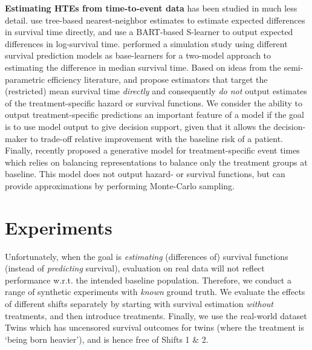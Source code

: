 \documentclass{article}
\begin{document}
\textbf{Estimating HTEs from time-to-event data} has been studied in much less detail. \cite{ tabib2020non, zhang2017mining} use tree-based nearest-neighbor estimates to estimate expected differences in survival time directly, and \cite{henderson2020individualized} use a BART-based S-learner to output expected differences in log-survival time. \cite{hu2020estimating} performed a simulation study using different survival prediction models as base-learners for a two-model approach to estimating the difference in median survival time. Based on ideas from the semi-parametric efficiency literature, \cite{cui2020estimating}
and \cite{diaz2018targeted} propose estimators that target the (restricted) mean survival time \textit{directly} and consequently \textit{do not} output estimates of the treatment-specific hazard or survival functions. We consider the ability to output treatment-specific predictions an important feature of a model if the goal is to use model output to give decision support, given that it allows the decision-maker to trade-off relative improvement with the baseline risk of a patient. Finally, \cite{chapfuwa2021enabling} recently proposed a generative model for treatment-specific event times which relies on balancing representations to balance only the treatment groups at baseline. This model does not output hazard- or survival functions, but can provide approximations by performing Monte-Carlo sampling.  






\section{Experiments}
Unfortunately, when the goal is \textit{estimating} (differences of) survival functions (instead of \textit{predicting} survival), evaluation on real data will not reflect performance w.r.t. the intended baseline population. 
Therefore, we conduct a range of synthetic experiments with \textit{known} ground truth. We evaluate the effects of different shifts separately by starting with survival estimation \textit{without} treatments, and then introduce treatments. Finally, we use the real-world dataset Twins \cite{louizos2017causal} which has uncensored survival outcomes for twins (where the treatment is `being born heavier'), and is hence free of Shifts 1 \& 2. 
\end{document}
